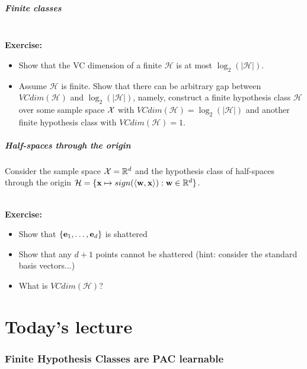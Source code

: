 \documentclass[11pt]{article}
\newcommand{\Hc}{\mathcal{H}}
\begin{document}
\subsubsection*{Finite classes}
~\\{\bf Exercise:}
\begin{itemize}
\item Show that the VC dimension of a finite $\Hc$ is at most
$\log_2(|\Hc|)$.
\item  Assume $\Hc$ is finite. Show that there can be arbitrary gap between $VCdim(\Hc)$ and
  $\log_2(|\Hc|)$, namely, construct a finite hypothesis class $\Hc$ over some sample space $\mathcal{X}$ with $VCdim(\Hc) = \log_2(|\Hc|)$ 
  and another finite hypothesis class with $VCdim(\Hc)=1$.  
\end{itemize}

\subsubsection*{Half-spaces through the origin}
Consider the sample space $\mathcal{X} = \mathbb{R}^d$ and the hypothesis class of half-spaces through the origin
$\Hc = \{ \x \mapsto sign(\inner{\w,\x}): \w \in \reals^d\}$. 

~\\{\bf Exercise:}
\begin{itemize}
\item Show that $\{{\mathbf e}_1,\ldots,{\mathbf e}_d\}$ is shattered
\item Show that any $d+1$ points cannot be shattered (hint: consider the standard basis vectors...)
\item What is $VCdim(\Hc)$?
\end{itemize}






\part{Today's lecture}

\section{Finite Hypothesis Classes are PAC learnable}
\end{document}
